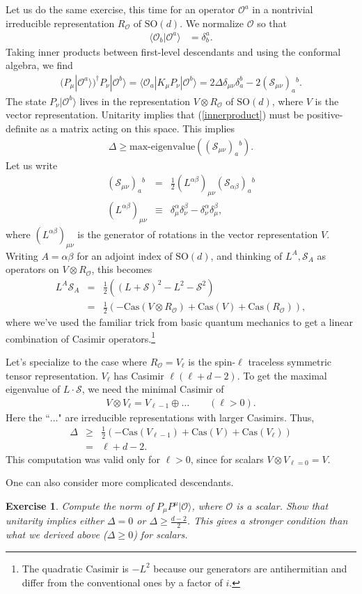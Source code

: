 \documentclass[11pt]{ws-rv9x6}
\newcommand\be{\begin{eqnarray}}
\newcommand\ee{\end{eqnarray}}
\newcommand\cO{\mathcal{O}}
\newcommand\p[1]{\left(#1\right)}
\newcommand\<\langle
\renewcommand\>\rangle
\newcommand\de\delta
\newcommand\nn{\nonumber}
\renewcommand\.{\cdot}
\newcommand\SO{\mathrm{SO}}
\newcommand\De{\Delta}
\newcommand\cS{\mathcal{S}}
\renewcommand\b\beta
\renewcommand\a\alpha
\newtheorem{exercise}{Exercise}[section]
\begin{document}
Let us do the same exercise, this time for an operator $\cO^a$ in a nontrivial irreducible representation $R_\cO$ of $\SO(d)$. We normalize $\cO$ so that
\be
\<\cO_b|\cO^a\> &= \de^a_b.
\ee
Taking inner products between first-level descendants and using the conformal algebra, we find
\be
(P_\mu|\cO^a\>)^\dag P_\nu|\cO^b\> = \<\cO_a|K_\mu P_\nu|\cO^b\>
= 2\De\de_{\mu\nu}\de_a^b-2(\cS_{\mu\nu})_a{}^b.\label{innerproduct}
\ee
The state $P_\nu|\cO^b\>$ lives in the representation $V\otimes R_\cO$ of $\SO(d)$, where $V$ is the vector representation.
Unitarity implies that (\ref{innerproduct}) must be positive-definite as a matrix acting on this space.  This implies
\be
\De\geq \textrm{max-eigenvalue}((\cS_{\mu\nu})_a{}^b).
\ee
Let us write
\be
(\cS_{\mu\nu})_a{}^b &=& \frac 1 2 (L^{\a\b})_{\mu\nu}(\cS_{\a\b})_a{}^b\nn\\
(L^{\a\b})_{\mu\nu} &\equiv& \de^\a_\mu\de^\b_\nu - \de^\a_\nu\de^\b_\mu,
\ee
where $(L^{\a\b})_{\mu\nu}$ is the generator of rotations in the vector representation $V$.  Writing $A=\a\b$ for an adjoint index of $\SO(d)$, and thinking of $L^A,\cS_A$ as operators on $V\otimes R_\cO$, this becomes
\be
L^A \cS_A &=& \frac 1 2 \p{(L+\cS)^2-L^2 -\cS^2}\nn\\
&=& \frac 1 2\p{-\mathrm{Cas}(V\otimes R_\cO)+\mathrm{Cas}(V)+\mathrm{Cas}(R_\cO)},
\ee
where we've used the familiar trick from basic quantum mechanics to get a linear combination of Casimir operators.\footnote{The quadratic Casimir is $-L^2$ because our generators are antihermitian and differ from the conventional ones by a factor of $i$.}

Let's specialize to the case where $R_\cO=V_\ell$ is the spin-$\ell$ traceless symmetric tensor representation.  $V_\ell$ has Casimir $\ell(\ell+d-2)$.  To get the maximal eigenvalue of $L\.\cS$, we need the minimal Casimir of
\be
V\otimes V_\ell=V_{\ell-1}\oplus \dots\qquad(\ell>0).
\ee
Here the ``$\dots$" are irreducible representations with larger Casimirs.  Thus,
\be
\De &\geq& \frac 1 2\p{-\mathrm{Cas}(V_{\ell-1})+\mathrm{Cas}(V)+\mathrm{Cas}(V_\ell)}\nn\\
&=& \ell+d-2.
\ee
This computation was valid only for $\ell> 0$, since for scalars $V\otimes V_{\ell=0}=V$.

One can also consider more complicated descendants.
\begin{exercise}
Compute the norm of $P_\mu P^\mu |\cO\>$, where $\cO$ is a scalar.  Show that unitarity implies either $\De=0$ or $\De\geq \frac{d-2}{2}$.  This gives a stronger condition than what we derived above ($\De\geq 0$) for scalars.
\end{exercise}
\end{document}
